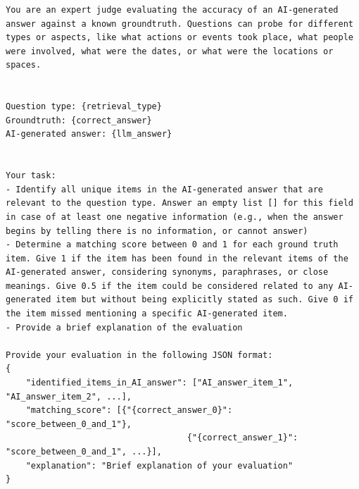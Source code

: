 \documentclass{article}
\begin{document}
\begin{lstlisting}[style=mystyle, caption={Template of the verification prompt of a single generated chapter candidate. The first highlighted element is replaced by the generated chapter candidate.}, label={lst:evaluation_prompt}]
You are an expert judge evaluating the accuracy of an AI-generated answer against a known groundtruth. Questions can probe for different types or aspects, like what actions or events took place, what people were involved, what were the dates, or what were the locations or spaces.


Question type: {retrieval_type}
Groundtruth: {correct_answer}
AI-generated answer: {llm_answer}


Your task:
- Identify all unique items in the AI-generated answer that are relevant to the question type. Answer an empty list [] for this field in case of at least one negative information (e.g., when the answer begins by telling there is no information, or cannot answer)
- Determine a matching score between 0 and 1 for each ground truth item. Give 1 if the item has been found in the relevant items of the AI-generated answer, considering synonyms, paraphrases, or close meanings. Give 0.5 if the item could be considered related to any AI-generated item but without being explicitly stated as such. Give 0 if the item missed mentioning a specific AI-generated item.
- Provide a brief explanation of the evaluation

Provide your evaluation in the following JSON format:
{
    "identified_items_in_AI_answer": ["AI_answer_item_1", "AI_answer_item_2", ...],
    "matching_score": [{"{correct_answer_0}": "score_between_0_and_1"}, 
                                    {"{correct_answer_1}": "score_between_0_and_1", ...}],
    "explanation": "Brief explanation of your evaluation"
}
\end{lstlisting}
\end{document}

